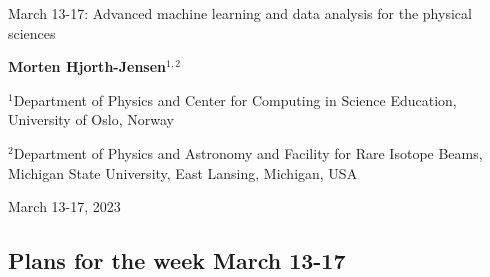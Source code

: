 \documentclass[%
oneside,                 %
final,                   %
10pt]{article}
\begin{document}

\newcommand{\exercisesection}[1]{\subsection*{#1}}






\thispagestyle{empty}

\begin{center}
{\LARGE\bf
\begin{spacing}{1.25}
March 13-17: Advanced machine learning and data analysis for the physical sciences
\end{spacing}
}
\end{center}


\begin{center}
{\bf Morten Hjorth-Jensen${}^{1, 2}$} \\ [0mm]
\end{center}

\begin{center}
\centerline{{\small ${}^1$Department of Physics and Center for Computing in Science Education, University of Oslo, Norway}}
\centerline{{\small ${}^2$Department of Physics and Astronomy and Facility for Rare Isotope Beams, Michigan State University, East Lansing, Michigan, USA}}
\end{center}
    

\begin{center}
March 13-17, 2023
\end{center}

\vspace{1cm}


\subsection{Plans for the week March 13-17}


\paragraph{}
\end{document}
